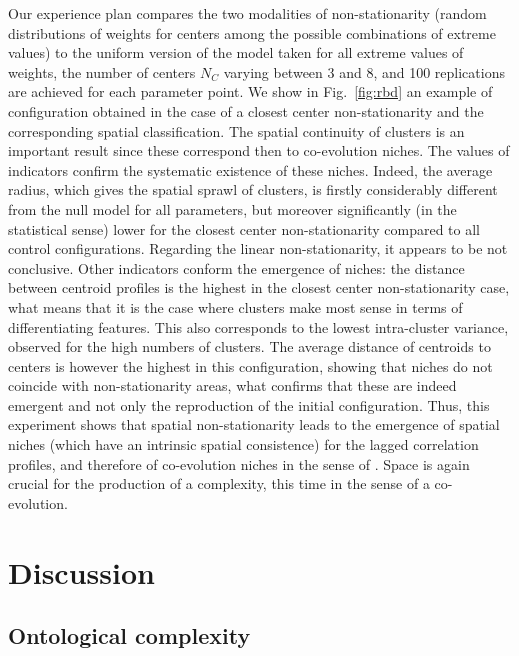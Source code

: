 \documentclass[fleqn,10pt]{wlscirep}
\begin{document}
 
Our experience plan compares the two modalities of non-stationarity (random distributions of weights for centers among the possible combinations of extreme values) to the uniform version of the model taken for all extreme values of weights, the number of centers $N_C$ varying between 3 and 8, and 100 replications are achieved for each parameter point. We show in Fig.~\ref{fig:rbd} an example of configuration obtained in the case of a closest center non-stationarity and the corresponding spatial classification. The spatial continuity of clusters is an important result since these correspond then to co-evolution niches. The values of indicators confirm the systematic existence of these niches. Indeed, the average radius, which gives the spatial sprawl of clusters, is firstly considerably different from the null model for all parameters, but moreover significantly (in the statistical sense) lower for the closest center non-stationarity compared to all control configurations. Regarding the linear non-stationarity, it appears to be not conclusive. Other indicators conform the emergence of niches: the distance between centroid profiles is the highest in the closest center non-stationarity case, what means that it is the case where clusters make most sense in terms of differentiating features. This also corresponds to the lowest intra-cluster variance, observed for the high numbers of clusters. The average distance of centroids to centers is however the highest in this configuration, showing that niches do not coincide with non-stationarity areas, what confirms that these are indeed emergent and not only the reproduction of the initial configuration. Thus, this experiment shows that spatial non-stationarity leads to the emergence of spatial niches (which have an intrinsic spatial consistence) for the lagged correlation profiles, and therefore of co-evolution niches in the sense of \cite{raimbault2018caracterisation}. Space is again crucial for the production of a complexity, this time in the sense of a co-evolution.









\section*{Discussion}


\subsection*{Ontological complexity}
\end{document}
